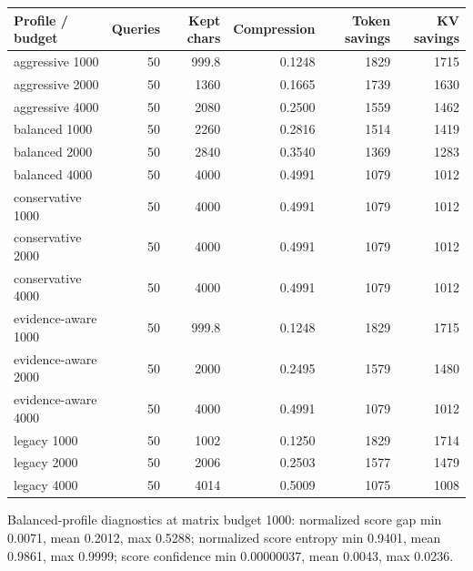 \begin{longtable}{l r r r r r}
\toprule
Profile / budget & Queries & Kept chars & Compression & Token savings & KV savings \\
\midrule
aggressive 1000 & 50 & 999.8 & 0.1248 & 1829 & 1715 \\
aggressive 2000 & 50 & 1360 & 0.1665 & 1739 & 1630 \\
aggressive 4000 & 50 & 2080 & 0.2500 & 1559 & 1462 \\
balanced 1000 & 50 & 2260 & 0.2816 & 1514 & 1419 \\
balanced 2000 & 50 & 2840 & 0.3540 & 1369 & 1283 \\
balanced 4000 & 50 & 4000 & 0.4991 & 1079 & 1012 \\
conservative 1000 & 50 & 4000 & 0.4991 & 1079 & 1012 \\
conservative 2000 & 50 & 4000 & 0.4991 & 1079 & 1012 \\
conservative 4000 & 50 & 4000 & 0.4991 & 1079 & 1012 \\
evidence-aware 1000 & 50 & 999.8 & 0.1248 & 1829 & 1715 \\
evidence-aware 2000 & 50 & 2000 & 0.2495 & 1579 & 1480 \\
evidence-aware 4000 & 50 & 4000 & 0.4991 & 1079 & 1012 \\
legacy 1000 & 50 & 1002 & 0.1250 & 1829 & 1714 \\
legacy 2000 & 50 & 2006 & 0.2503 & 1577 & 1479 \\
legacy 4000 & 50 & 4014 & 0.5009 & 1075 & 1008 \\
\bottomrule
\end{longtable}

Balanced-profile diagnostics at matrix budget 1000: normalized score gap min 0.0071, mean 0.2012, max 0.5288; normalized score entropy min 0.9401, mean 0.9861, max 0.9999; score confidence min 0.00000037, mean 0.0043, max 0.0236.
